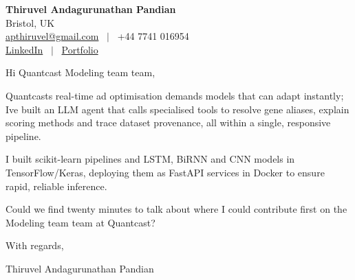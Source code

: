 \documentclass[11pt,a4paper]{article}
\begin{document}
\raggedright
\pagestyle{empty}

\begin{center}
    {\LARGE \color{linkblue} \textbf{Thiruvel Andagurunathan Pandian}}\\[0.2cm]
    Bristol, UK \\
    \href{mailto:apthiruvel@gmail.com}{apthiruvel@gmail.com} \ $|$ \ +44 7741 016954 \\
\href{https://www.linkedin.com/in/thiruvel-a-p/}{LinkedIn} \ $|$ \ \href{https://thiruvel-ap.github.io/PersonalPortfolio/}{Portfolio}
\end{center}

\vspace{0.4cm}

\noindent
Hi Quantcast Modeling team team,

Quantcast\textquotesingle{}s real-time ad optimisation demands models that can adapt instantly; I\textquotesingle{}ve built an LLM agent that calls specialised tools to resolve gene aliases, explain scoring methods and trace dataset provenance, all within a single, responsive pipeline.

I built scikit-learn pipelines and LSTM, BiRNN and CNN models in TensorFlow/Keras, deploying them as FastAPI services in Docker to ensure rapid, reliable inference.

Could we find twenty minutes to talk about where I could contribute first on the Modeling team team at Quantcast?

\vspace{0.5cm}

With regards,

Thiruvel Andagurunathan Pandian
\end{document}

